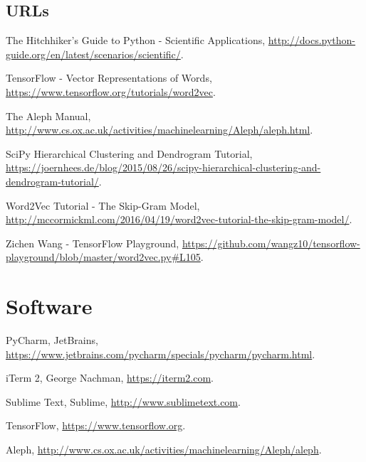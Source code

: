 \documentclass[12pt, openany]{book}
\begin{document}
\subsection{URLs}
\begin{description}
\item The Hitchhiker's Guide to Python - Scientific Applications, \url{http://docs.python-guide.org/en/latest/scenarios/scientific/}.
\item TensorFlow - Vector Representations of Words, \url{https://www.tensorflow.org/tutorials/word2vec}.
\item The Aleph Manual, \url{http://www.cs.ox.ac.uk/activities/machinelearning/Aleph/aleph.html}.
\item SciPy Hierarchical Clustering and Dendrogram Tutorial, \url{https://joernhees.de/blog/2015/08/26/scipy-hierarchical-clustering-and-dendrogram-tutorial/}.
\item Word2Vec Tutorial - The Skip-Gram Model, \url{http://mccormickml.com/2016/04/19/word2vec-tutorial-the-skip-gram-model/}.
\item Zichen Wang - TensorFlow Playground, \url{https://github.com/wangz10/tensorflow-playground/blob/master/word2vec.py#L105}.
\end{description}
\section{Software}
\begin{description}
\item PyCharm, JetBrains, \url{https://www.jetbrains.com/pycharm/specials/pycharm/pycharm.html}.
\item iTerm 2, George Nachman, \url{https://iterm2.com}.
\item Sublime Text, Sublime, \url{http://www.sublimetext.com}.
\item TensorFlow, \url{https://www.tensorflow.org}.
\item Aleph, \url{http://www.cs.ox.ac.uk/activities/machinelearning/Aleph/aleph}.
\end{description}
\end{document}
